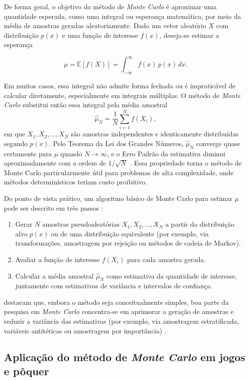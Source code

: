 De forma geral, o objetivo do método de \textit{Monte Carlo} é aproximar uma quantidade esperada, como uma integral ou esperança matemática, por meio da média de amostras geradas aleatoriamente. Dado um vetor aleatório \(X\) com distribuição \(p(x)\) e uma função de interesse $ f(x) $, deseja-se estimar a esperança

$$\mu = \mathbb{E}[f(X)] = \int_{-\infty}^{\infty} f(x)\, p(x)\, dx.$$

Em muitos casos, essa integral não admite forma fechada ou é impraticável de calcular diretamente, especialmente em integrais múltiplas. O método de \textit{Monte Carlo} substitui então essa integral pela média amostral
$$\hat{\mu}_N = \frac{1}{N} \sum_{i=1}^{N} f(X_i),$$
em que \(X_1, X_2, \dots, X_N\) são amostras independentes e identicamente distribuídas segundo \(p(x)\). Pelo Teorema da Lei dos Grandes Números, \(\hat{\mu}_N\) converge quase certamente para \(\mu\) quando \(N \to \infty\), e o Erro Padrão da estimativa diminui aproximadamente com a ordem de \(1/\sqrt{N}\) . Essa propriedade torna o método de Monte Carlo particularmente útil para problemas de alta complexidade, onde métodos determinísticos teriam custo proibitivo.

Do ponto de vista prático, um algoritmo básico de Monte Carlo para estimar \(\mu\) pode ser descrito em três passos :
\begin{enumerate}
      \item Gerar \(N\) amostras pseudoaleatórias \(X_1, X_2, \dots, X_N\) a partir da distribuição alvo \(p(x)\) ou de uma distribuição equivalente (por exemplo, via transformações, amostragem por rejeição ou métodos de cadeia de Markov).
      \item Avaliar a função de interesse \(f(X_i)\) para cada amostra gerada.
      \item Calcular a média amostral \(\hat{\mu}_N\) como estimativa da quantidade de interesse, juntamente com estimativas de variância e intervalos de confiança.
\end{enumerate}
 destacam que, embora o método seja conceitualmente simples, boa parte da pesquisa em \textit{Monte Carlo} concentra-se em aprimorar a geração de amostras e reduzir a variância das estimativas (por exemplo, via amostragem estratificada, variáveis antitéticas ou amostragem por importância) .

\subsection{Aplicação do método de \textit{Monte Carlo} em jogos e pôquer}

